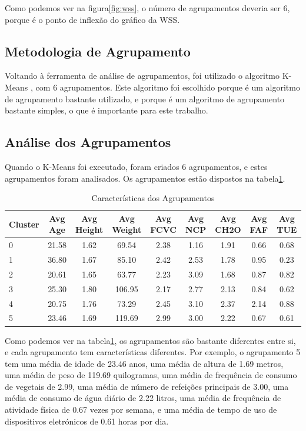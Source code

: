 \documentclass{easychair}
\begin{document}
Como podemos ver na figura\ref{fig:wss}, o número de agrupamentos deveria ser 6, porque é o ponto de inflexão do gráfico da WSS.

\subsection{Metodologia de Agrupamento}

Voltando à ferramenta de análise de agrupamentos, foi utilizado o algoritmo K-Means \cite{kmeans}, com 6 agrupamentos. Este algoritmo foi escolhido porque é um algoritmo de agrupamento bastante utilizado, e porque é um algoritmo de agrupamento bastante simples, o que é importante para este trabalho.

\subsection{Análise dos Agrupamentos}

Quando o K-Means \cite{kmeans} foi executado, foram criados 6 agrupamentos, e estes agrupamentos foram analisados. Os agrupamentos estão dispostos na tabela\ref{tab:clusters}.

\begin{table}[ht]
  \centering
  \begin{tabular}{l c c c c c c c c}
  \toprule
  Cluster & Avg Age & Avg Height & Avg Weight & Avg FCVC & Avg NCP & Avg CH2O & Avg FAF & Avg TUE \\
  \midrule
  0       & 21.58   & 1.62       & 69.54      & 2.38     & 1.16    & 1.91     & 0.66    & 0.68    \\
  1       & 36.80   & 1.67       & 85.10      & 2.42     & 2.53    & 1.78     & 0.95    & 0.23    \\
  2       & 20.61   & 1.65       & 63.77      & 2.23     & 3.09    & 1.68     & 0.87    & 0.82    \\
  3       & 25.30   & 1.80       & 106.95     & 2.17     & 2.77    & 2.13     & 0.84    & 0.62    \\
  4       & 20.75   & 1.76       & 73.29      & 2.45     & 3.10    & 2.37     & 2.14    & 0.88    \\
  5       & 23.46   & 1.69       & 119.69     & 2.99     & 3.00    & 2.22     & 0.67    & 0.61    \\
  \bottomrule
  \end{tabular}
  \caption{Características dos Agrupamentos}
  \label{tab:clusters}
\end{table}

Como podemos ver na tabela\ref{tab:clusters}, os agrupamentos são bastante diferentes entre si, e cada agrupamento tem características diferentes. Por exemplo, o agrupamento 5 tem uma média de idade de 23.46 anos, uma média de altura de 1.69 metros, uma média de peso de 119.69 quilogramas, uma média de frequência de consumo de vegetais de 2.99, uma média de número de refeições principais de 3.00, uma média de consumo de água diário de 2.22 litros, uma média de frequência de atividade física de 0.67 vezes por semana, e uma média de tempo de uso de dispositivos eletrónicos de 0.61 horas por dia.
\end{document}

